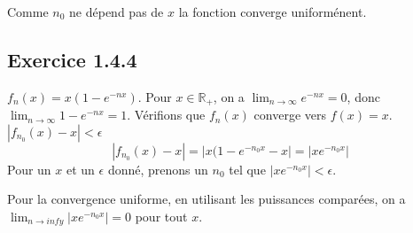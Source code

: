 \documentclass[]{book}
\theoremstyle{definition}
\newcommand{\bb}[1]{\mathbb{#1}}
\newcommand{\R}{\bb{R}}
\begin{document}
Comme $n_0$ ne d\'epend pas de $x$ la fonction converge uniform\'enent.

\subsection*{Exercice 1.4.4}
$f_n(x) = x(1-e^{-nx})$. Pour $x \in \R_{+}$, on a $\lim_{n \to \infty}{ e^{-nx}} = 0$, donc $\lim_{n \to \infty}{1 - e^{-nx}} = 1$. V\'erifions que $f_n(x)$ converge vers $f(x)=x$. $|f_{n_0}(x) - x| < \epsilon$
$$
|f_{n_0}(x) - x| = \left|x(1-e^{-n_0x} -x \right| = \left| xe^{-n_0x} \right| 
$$
Pour un $x$ et un $\epsilon$ donn\'e, prenons un $n_0$ tel que $\left| xe^{-n_0x} \right| < \epsilon$.

Pour la convergence uniforme, en utilisant les puissances compar\'ees, on a $\lim_{n \to infy} \left| xe^{-n_0x} \right| = 0$ pour tout $x$.
\end{document}
